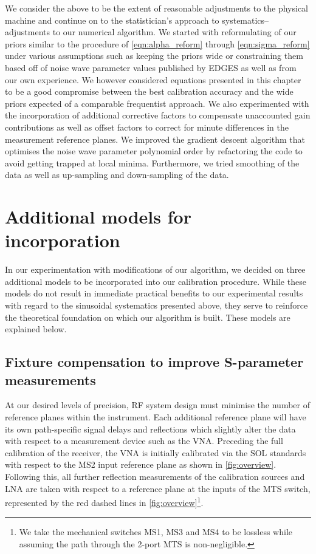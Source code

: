 We consider the above to be the extent of reasonable adjustments to the physical machine and continue on to the statistician’s approach to systematics--adjustments to our numerical algorithm. We started with reformulating of our priors similar to the procedure of \cref{eqn:alpha_reform} through \cref{eqn:sigma_reform} under various assumptions such as keeping the priors wide or constraining them based off of noise wave parameter values published by EDGES as well as from our own experience. We however considered equations presented in this chapter to be a good compromise between the best calibration accuracy and the wide priors expected of a comparable frequentist approach. We also experimented with the incorporation of additional corrective factors to compensate unaccounted gain contributions as well as offset factors to correct for minute differences in the measurement reference planes. We improved the gradient descent algorithm that optimises the noise wave parameter polynomial order by refactoring the code to avoid getting trapped at local minima. Furthermore, we tried smoothing of the data as well as up-sampling and down-sampling of the data.

\section{Additional models for incorporation}\label{sec:additional_models}
In our experimentation with modifications of our algorithm, we decided on three additional models to be incorporated into our calibration procedure. While these models do not result in immediate practical benefits to our experimental results with regard to the sinusoidal systematics presented above, they serve to reinforce the theoretical foundation on which our algorithm is built. These models are explained below.

\subsection{Fixture compensation to improve S-parameter measurements}\label{sec:tparameters}
At our desired levels of precision, RF system design must minimise the number of reference planes within the instrument. Each additional reference plane will have its own path-specific signal delays and reflections which slightly alter the data with respect to a measurement device such as the VNA. Preceding the full calibration of the receiver, the VNA is initially calibrated via the SOL standards with respect to the MS2 input reference plane as shown in \cref{fig:overview}. Following this, all further reflection measurements of the calibration sources and LNA are taken with respect to a reference plane at the inputs of the MTS switch, represented by the red dashed lines in \cref{fig:overview}\footnote{We take the mechanical switches MS1, MS3 and MS4 to be lossless while assuming the path through the 2-port MTS is non-negligible.}.


